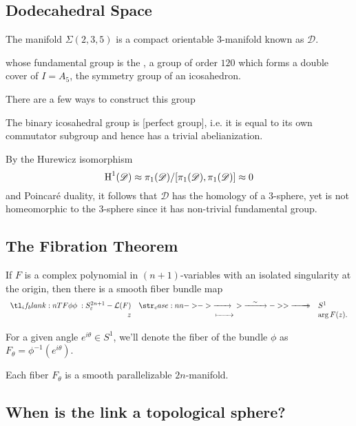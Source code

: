 \subsection*{Dodecahedral Space}

The manifold $\Sigma(2,3,5)$ is a compact orientable $3$-manifold known as  $\mathscr{D}$.

whose fundamental group is the , a group of order $120$ which forms a double cover of $I=A_5$, the symmetry group of an icosahedron.

There are a few ways to construct this group

\begin{proposition}
	The binary icosahedral group is [perfect group], i.e. it is equal to its own commutator subgroup and hence has a trivial abelianization.
\end{proposition}

By the Hurewicz isomorphism \[
	\operatorname{H}^1(\mathscr{D}) \approx \pi_1(\mathscr{D})/[\pi_1(\mathscr{D}), \pi_1(\mathscr{D})] \approx 0
\]
and Poincar\'e duality, it follows that $\mathscr{D}$ has the homology of a $3$-sphere, yet is not homeomorphic to the $3$-sphere since it has non-trivial fundamental group. 

\subsection*{The Fibration Theorem}

\begin{theorem}\label{thm:fibration}
	If $F$ is a complex polynomial in $(n+1)$-variables with an isolated singularity at the origin, then there is a smooth fiber bundle map
	\[
		\lkxfunc{\phi}{S^{2n+1}_\varepsilon - \L(F)}{S^1}{z}{\arg F(z).}
	\]
\end{theorem}

For a given angle $e^{i\theta}\in S^1$, we'll denote the fiber of the bundle $\phi$ as $F_\theta = \phi^{-1}(e^{i\theta})$.

\begin{proposition}
  Each fiber $F_\theta$ is a smooth parallelizable $2n$-manifold.
\end{proposition}

\subsection*{When is the link a topological sphere?}

